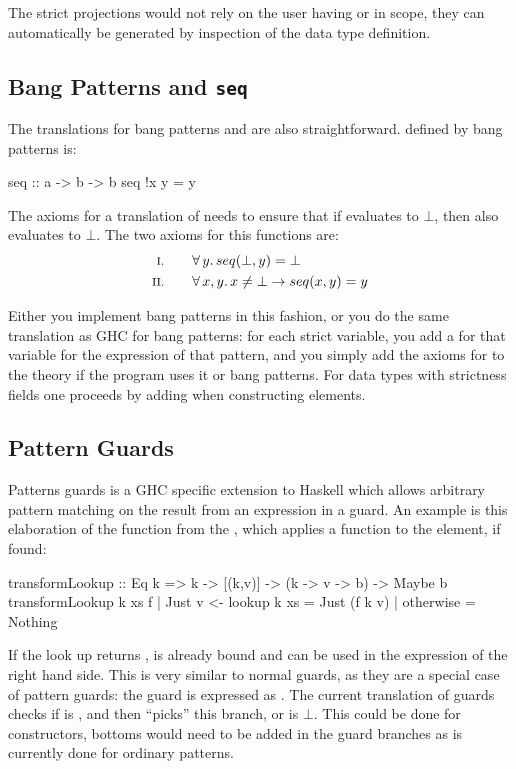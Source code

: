 The strict projections would not rely on the user having  or
 in scope, they can automatically be generated by
inspection of the data type definition.

\subsection{Bang Patterns and \texttt{seq}}

The translations for bang patterns and  are also
straightforward.  defined by bang patterns is:

\begin{code}
seq :: a -> b -> b
seq !x y = y
\end{code}

The axioms for a translation of  needs to ensure that if
 evaluates to $\bot$, then  also evaluates to
$\bot$. The two axioms for this functions are:
\begin{align*}
\rom{1} \qquad & \fa{y}    seq(\bot,y) \eq \bot \\
\rom{2} \qquad & \faa{x}{y} x \neq \bot \rightarrow seq(x,y) \eq y
\end{align*}

Either you implement bang patterns in this fashion, or you do the same
translation as GHC for bang patterns: for each strict variable, you
add a  for that variable for the expression of that pattern,
and you simply add the axioms for  to the theory if the
program uses it or bang patterns. For data types with strictness
fields one proceeds by adding  when constructing elements.

\subsection{Pattern Guards}

Patterns guards is a GHC specific extension to Haskell which allows
arbitrary pattern matching on the result from an expression in a
guard. An example is this elaboration of the  function from
the , which applies a function to the element, if found:

\begin{code}
transformLookup :: Eq k => k -> [(k,v)] -> (k -> v -> b) -> Maybe b
transformLookup k xs f | Just v <- lookup k xs = Just (f k v)
                       | otherwise             = Nothing
\end{code}

\noindent
If the look up returns ,  is already bound and can be
used in the expression of the right hand side. This is very similar to
normal guards, as they are a special case of pattern guards: the guard
 is expressed as . The current
translation of guards checks if  is , and then
``picks'' this branch, or is $\bot$. This could be done for
constructors, bottoms would need to be added in the guard branches as
is currently done for ordinary patterns.

